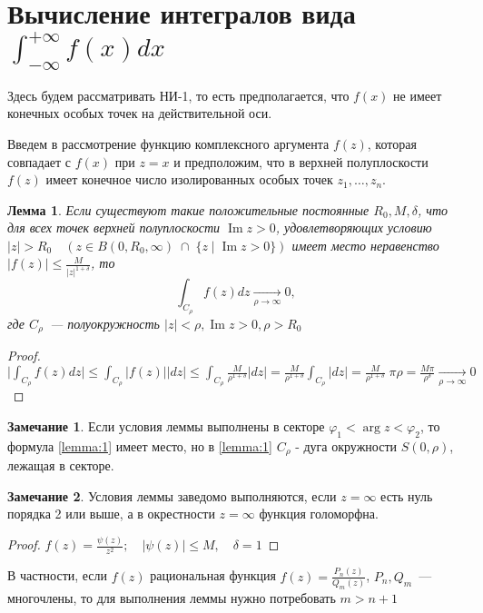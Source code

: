 \documentclass[a4paper, 12pt]{article}
\DeclareMathOperator{\ImR}{Im}
\theoremstyle{definition}
\newtheorem*{remark}{Замечание}
\theoremstyle{definition}
\theoremstyle{plain}
\newtheorem*{lemma}{Лемма}
\theoremstyle{plain}
\theoremstyle{plain}
\begin{document}
\section{Вычисление интегралов вида $\displaystyle \int_{-\infty}^{+\infty}f(x) dx$}
Здесь будем рассматривать НИ-1, то есть предполагается, что $f(x)$ не имеет конечных особых точек на действительной оси.

Введем в рассмотрение функцию комплексного аргумента $f(z)$, которая совпадает с $f(x)$ при $z=x$ 
и предположим, что в верхней полуплоскости $f(z)$ имеет конечное число изолированных особых точек $z_1,\dotsc,z_n$.

\begin{lemma}
    Если существуют такие положительные постоянные $R_0, M, \delta$, что для всех точек верхней полуплоскости $\ImR z>0$,
    удовлетворяющих условию $\displaystyle |z|>R_0 \quad (z\in B(0, R_0, \infty)\;\cap\;\{z \;|\; \ImR z>0\})$ имеет место неравенство
    $\displaystyle |f(z)| \leqslant \frac{M}{|z|^{1+\delta}}$, то
    \begin{equation} \label{lemma:1}
        \int_{C_\rho} f(z)dz \xrightarrow[\rho \to \infty]{} 0,
    \end{equation}
    где $ C_\rho $~--- полуокружность $|z|<\rho, \ImR z>0, \rho>R_0$
\end{lemma}
\begin{proof}
    $\displaystyle \bigg\lvert\int_{C_\rho} f(z)dz \bigg\rvert \leqslant \int_{C_\rho} |f(z)||dz| \leqslant \int_{C_\rho} \frac{M}{\rho^{1+\delta}}|dz| = \frac{M}{\rho^{1+\delta}} \int_{C_\rho} |dz| = \frac{M}{\rho^{1+\delta}} \; \pi \rho = \frac{M\pi}{\rho^\delta} \xrightarrow[\rho \to \infty]{} 0 $
\end{proof}
\begin{remark}
    Если условия леммы выполнены в секторе $\varphi_1<\arg z < \varphi_2$, то формула \eqref{lemma:1} имеет место, но в \eqref{lemma:1} $C_\rho$ - дуга окружности $S(0, \rho)$, лежащая в секторе.
\end{remark}
\begin{remark}
    Условия леммы заведомо выполняются, если $z=\infty$ есть нуль порядка 2 или выше, а в окрестности $z=\infty$ функция голоморфна.
\end{remark}
\begin{proof}
    $\displaystyle f(z) = \frac{\psi(z)}{z^2}; \quad |\psi(z)|\leqslant M, \quad \delta=1$
\end{proof}
В частности, если $f(z)$ рациональная функция $\displaystyle f(z)=\frac{P_n(z)}{Q_m(z)}$, $P_n, Q_m$~--- многочлены, то для выполнения леммы нужно потребовать $m>n+1$
\end{document}
